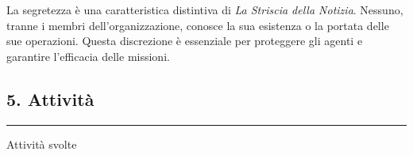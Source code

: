 La segretezza è una caratteristica distintiva di \emph{La Striscia della
Notizia}. Nessuno, tranne i membri dell'organizzazione, conosce la sua
esistenza o la portata delle sue operazioni. Questa discrezione è
essenziale per proteggere gli agenti e garantire l'efficacia delle
missioni.

\subsection{5. Attività}\label{attivituxe0}

\begin{center}\rule{0.5\linewidth}{0.5pt}\end{center}

Attività svolte
